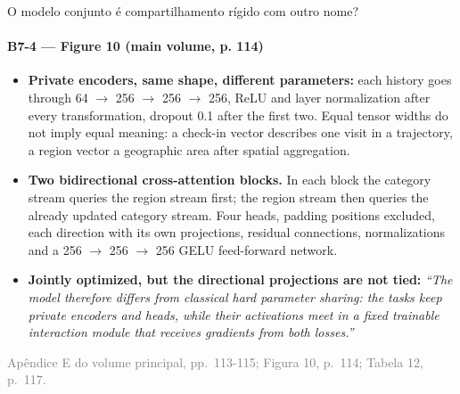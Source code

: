 \documentclass{beamer}
\begin{document}
\begin{frame}[noframenumbering]{O modelo conjunto é compartilhamento rígido com outro nome?}
    \framesubtitle{B7-4 --- Figure 10 (main volume, p. 114)}
    \hypertarget{b74}{}
    \small
    \begin{itemize}\setlength{\itemsep}{0pt}\setlength{\parskip}{0pt}
        \item \textbf{Private encoders, same shape, different parameters:} each history goes through 64 $\to$ 256 $\to$ 256 $\to$ 256, ReLU and layer normalization after every transformation, dropout 0.1 after the first two. Equal tensor widths do not imply equal meaning: a check-in vector describes one visit in a trajectory, a region vector a geographic area after spatial aggregation.
        \item \textbf{Two bidirectional cross-attention blocks.} In each block the category stream queries the region stream first; the region stream then queries the already updated category stream. Four heads, padding positions excluded, each direction with its own projections, residual connections, normalizations and a 256 $\to$ 256 $\to$ 256 GELU feed-forward network.
        \item \textbf{Jointly optimized, but the directional projections are not tied:} \textit{``The model therefore differs from classical hard parameter sharing: the tasks keep private encoders and heads, while their activations meet in a fixed trainable interaction module that receives gradients from both losses.''}
    \end{itemize}
    \vfill
    {\scriptsize
    \begin{minipage}[b]{0.775\linewidth}\raggedright\textcolor{gray}{Apêndice E do volume principal, pp.~113-115; Figura 10, p.~114; Tabela 12, p.~117.}\end{minipage}\hfill
    \begin{minipage}[b]{0.20\linewidth}\raggedleft \hyperlink{b0}{}\end{minipage}}
\end{frame}
\end{document}

